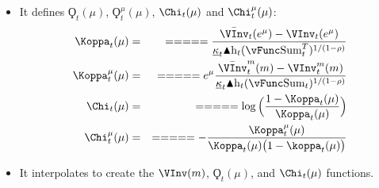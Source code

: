 \documentclass[titlepage,abstract]{\econtex}
\providecommand{\kappaMin}{\kappa\text{Min}}
\providecommand{\vSum}{\vFunc\text{Sum}}
\providecommand{\Deltah}{\blacktriangle \mathrm{h}}
\providecommand{\vInv}{\ensuremath{\scriptstyle \Lambda \displaystyle}}
\begin{document}
\begin{itemize}
\begin{equation}
\begin{gathered}
\begin{aligned}
            \kappaMin_{t} (\vSum_{t}^{T})^{1/(1-\rho)} \\
            \vInv_{t} (m) &\equiv&
            \big((1-\rho)\vFunc_{t} (m)\big)^{1/(1-\rho)} \\
            \vInv_{t}^{m} (m)      &=& =  =  =  =  = 
            \big((1-\rho)\vFunc_{t} (m)\big)^{1/(1-\rho)-1} \vFunc_{t}^{m} (m)\\
                 &=& =  =  =  =  = 
            \big((1-\rho)\vFunc_{t} (m)\big)^{1/(1-\rho)-1} u\text{P}\big(c_{t}(m)\big) \\
            \end{aligned}\end{gathered}\end{equation}

        \item It defines $\ensuremath{\Koppa}_{t}(\mu)$, $\ensuremath{\Koppa}_{t}^{\mu}(\mu)$, $\Chi_{t}(\mu)$ and $\Chi_{t}^{\mu}(\mu)$:
            \begin{equation}\begin{gathered}\begin{aligned}
            \Koppa_{t} (\mu)      &=& =  =  =  =  =  \frac{\bar{\VInv}_{t} (e^{\mu}) -\VInv_{t} (e^{\mu})}{\underline{\kappa}_{t} \Deltah_{t} (\vSum_{t}^{T})^{1/(1-\rho)}} \\
            \Koppa_{t}^{\mu} (\mu)      &=& =  =  =  =  =  e^{\mu} \frac{\bar{\VInv}_{t}^{m} (m)- \VInv_{t}^{m} (m)}{\underline{\kappa}_{t} \Deltah_{t} (\vSum_{t})^{1/(1-\rho)}} \\
            \Chi_{t} (\mu)      &=& =  =  =  =  =  \log\Big(\frac{1-\Koppa_{t} (\mu)}{\Koppa_{t} (\mu) }\Big) \\
            \Chi_{t}^{\mu} (\mu)      &=& =  =  =  =  =  -\frac{\Koppa_{t}^{\mu}(\mu)}{\Koppa_{t} (\mu)\big(1-\koppa_{t} (\mu)\big)}
            \end{aligned}\end{gathered}\end{equation}
        \item It interpolates to create the $\VInv(m)$, $\ensuremath{\Koppa}_{t}(\mu)$, and $\Chi_{t}(\mu)$ functions.
        \end{itemize}
\end{document}
